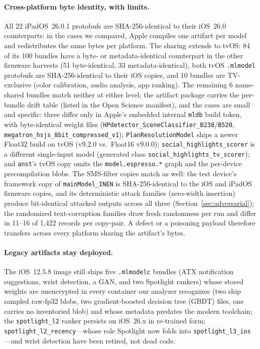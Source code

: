 \documentclass[letterpaper,twocolumn,10pt]{article}
\newcommand{\mlmodel}{\texttt{.mlmodel}\xspace}
\newcommand{\mlmodelc}{\texttt{.mlmodelc}\xspace}
\begin{document}
\paragraph{Cross-platform byte identity, with limits.}
All 22 iPadOS~26.0.1 protobufs are SHA-256-identical to their iOS~26.0
counterparts: in the cases we compared, Apple compiles one artifact per
model and redistributes the same bytes per platform.
The sharing extends to tvOS: 84 of its 100 bundles have a byte- or
metadata-identical counterpart in the other firmware harvests (51
byte-identical, 33 metadata-identical), both tvOS \mlmodel{} protobufs
are SHA-256-identical to their iOS copies, and 10 bundles are TV-exclusive
(color calibration, audio analysis, app ranking).
The remaining 6 name-shared bundles match neither at either level; the
artifact package carries the per-bundle drift table (listed in the Open
Science manifest), and the cases are
small and specific: three differ only in Apple's embedded internal
\texttt{mldb} build token, with byte-identical weight files
(\texttt{HPdetector\_}\allowbreak\texttt{SceneClassifier\_}\allowbreak\texttt{B238}/\texttt{B520},
\texttt{megatron\_}\allowbreak\texttt{hsjs\_}\allowbreak\texttt{8bit\_}\allowbreak\texttt{compressed\_}\allowbreak\texttt{v1});
\texttt{PlanResolutionModel} ships a newer Float32 build on tvOS
(v9.2.0 vs.\ Float16 v9.0.0); \texttt{social\_}\allowbreak\texttt{highlights\_}\allowbreak\texttt{scorer}
is a different single-input model (generated class
\texttt{social\_}\allowbreak\texttt{highlights\_}\allowbreak\texttt{tv\_}\allowbreak\texttt{scorer}); and
\texttt{anst}'s tvOS copy omits the \texttt{model.espresso.*} graph and the
per-device precompilation blobs.
The SMS-filter copies match as well: the test device's framework copy of
\texttt{mainModel\_}\allowbreak\texttt{INEN} is SHA-256-identical to the iOS and iPadOS firmware
copies, and its deterministic attack families (zero-width insertion)
produce bit-identical attacked outputs across all three
(Section~\ref{sec:adversarial}); the randomized text-corruption families
draw fresh randomness per run and differ in 11--16 of 1{,}422 records per
copy-pair.
A defect or a poisoning payload therefore transfers across every platform
sharing the artifact's bytes.

\paragraph{Legacy artifacts stay deployed.}
The iOS~12.5.8 image still ships five \mlmodelc{} bundles (ATX notification
suggestions, wrist detection, a GAN, and two Spotlight rankers) whose stored
weights are unencrypted in every container our analyzer recognizes (two
ship sampled raw-fp32 blobs, two gradient-boosted decision tree (GBDT)
files, one carries no inventoried blob) and whose metadata predates the modern toolchain; the
\texttt{spotlight\_l2} ranker persists on iOS~26.x in re-trained form;
\texttt{spotlight\_l2\_recency}---whose role Spotlight now folds into
\texttt{spotlight\_l3\_ios}---and wrist detection have been retired,
not dead code.
\end{document}
